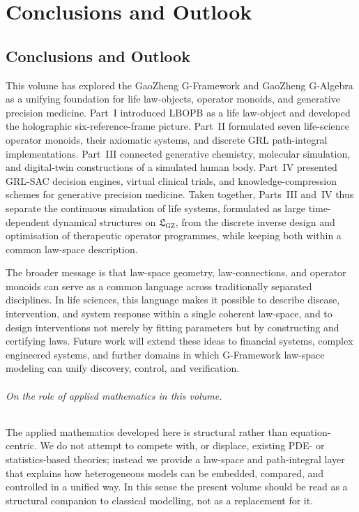 \documentclass[11pt]{book}
\theoremstyle{plain}
\theoremstyle{definition}
\theoremstyle{remark}
\newcommand{\GZLS}{\ensuremath{\mathfrak{L}_{\mathrm{GZ}}}}       \newcommand{\GZLT}{\ensuremath{M_{!w}}}                           \newcommand{\GZLOC}{\ensuremath{A_M}}                             \newcommand{\GZLCurv}{\ensuremath{\mathcal{F}_{\mathrm{law}}}}
\begin{document}
\part*{Conclusions and Outlook}

\chapter*{Conclusions and Outlook}


This volume has explored the GaoZheng G-Framework and GaoZheng
G-Algebra as a unifying foundation for life law-objects, operator
monoids, and generative precision medicine. Part~I introduced LBOPB as
a life law-object and developed the holographic six-reference-frame
picture. Part~II formulated seven life-science operator monoids, their
axiomatic systems, and discrete GRL path-integral implementations.
Part~III connected generative chemistry, molecular simulation, and
digital-twin constructions of a simulated human body. Part~IV
presented GRL-SAC decision engines, virtual clinical trials, and
knowledge-compression schemes for generative precision medicine.
Taken together, Parts~III and~IV thus separate the continuous
simulation of life systems, formulated as large time-dependent
dynamical structures on $\GZLS$, from the discrete inverse design and
optimisation of therapeutic operator programmes, while keeping both
within a common law-space description.

The broader message is that law-space geometry, law-connections, and
operator monoids can serve as a common language across traditionally
separated disciplines. In life sciences, this language makes it
possible to describe disease, intervention, and system response within
a single coherent law-space, and to design interventions not merely by
fitting parameters but by constructing and certifying laws. Future
work will extend these ideas to financial systems, complex engineered
systems, and further domains in which G-Framework law-space modeling
can unify discovery, control, and verification.

\paragraph{On the role of applied mathematics in this volume.}
The applied mathematics developed here is structural rather than
equation-centric. We do not attempt to compete with, or displace,
existing PDE- or statistics-based theories; instead we provide a
law-space and path-integral layer that explains how heterogeneous
models can be embedded, compared, and controlled in a unified way. In
this sense the present volume should be read as a structural companion
to classical modelling, not as a replacement for it.
\end{document}

